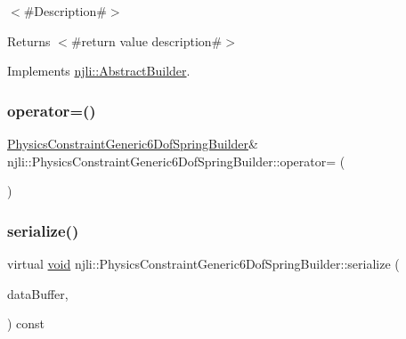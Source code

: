 $<$\#\+Description\#$>$

\begin{DoxyReturn}{Returns}
$<$\#return value description\#$>$ 
\end{DoxyReturn}


Implements \mbox{\hyperlink{classnjli_1_1_abstract_builder_a3e6e553e06d1ca30517ad5fb0bd4d000}{njli\+::\+Abstract\+Builder}}.

\mbox{\label{classnjli_1_1_physics_constraint_generic6_dof_spring_builder_a0a2ee57a64c09b4909393de031a1bda0}} 
\subsubsection{\texorpdfstring{operator=()}{operator=()}}
{\footnotesize\ttfamily \mbox{\hyperlink{classnjli_1_1_physics_constraint_generic6_dof_spring_builder}{Physics\+Constraint\+Generic6\+Dof\+Spring\+Builder}}\& njli\+::\+Physics\+Constraint\+Generic6\+Dof\+Spring\+Builder\+::operator= (\begin{DoxyParamCaption}\item[{const \mbox{\hyperlink{classnjli_1_1_physics_constraint_generic6_dof_spring_builder}{Physics\+Constraint\+Generic6\+Dof\+Spring\+Builder}} \&}]{ }\end{DoxyParamCaption})\hspace{0.3cm}{\ttfamily [protected]}}

\mbox{\label{classnjli_1_1_physics_constraint_generic6_dof_spring_builder_a5ffe1a93e4bf4466a0b460314a96c15f}} 
\subsubsection{\texorpdfstring{serialize()}{serialize()}}
{\footnotesize\ttfamily virtual \mbox{\hyperlink{_thread_8h_af1e856da2e658414cb2456cb6f7ebc66}{void}} njli\+::\+Physics\+Constraint\+Generic6\+Dof\+Spring\+Builder\+::serialize (\begin{DoxyParamCaption}\item[{\mbox{\hyperlink{_thread_8h_af1e856da2e658414cb2456cb6f7ebc66}{void}} $\ast$}]{data\+Buffer,  }\item[{bt\+Serializer $\ast$}]{ }\end{DoxyParamCaption}) const\hspace{0.3cm}{\ttfamily [virtual]}}



